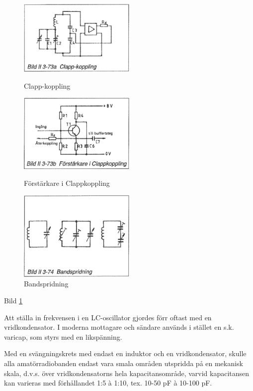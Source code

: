 \begin{figure}
  \includegraphics[width=0.5\textwidth]{images/bild_2_3-73a}
  \caption{Clapp-koppling}
  \label{fig:BildII3-73a}

  \includegraphics[width=0.5\textwidth]{images/bild_2_3-73b}
  \caption{Förstärkare i Clappkoppling}
  \label{fig:BildII3-73b}

  \includegraphics[width=0.5\textwidth]{images/bild_2_3-74}
  \caption{Bandspridning}
  \label{fig:BildII3-74}
\end{figure}

Bild \ref{fig:BildII3-74}

Att ställa in frekvensen i en LC-oscillator gjordes förr oftast med en
vridkondensator. I moderna mottagare och sändare används i stället en
s.k. varicap, som styrs med en likspänning.

Med en svängningskrets med endast en induktor och en vridkondensator,
skulle alla amatörradiobanden endast vara smala områden utspridda på
en mekanisk skala, d.v.s.  över vridkondensatorns hela
kapacitansområde, varvid kapacitansen kan varieras med förhållandet
1:5 à 1:10, tex. 10-50 pF à 10-100 pF.

